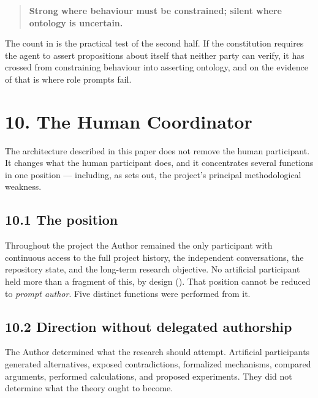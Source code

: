 \begin{quote}
\textbf{Strong where behaviour must be constrained; silent where ontology is uncertain.}
\end{quote}
The count in  is the practical test of the second half. If the constitution requires the agent to assert propositions about itself that neither party can verify, it has crossed from constraining behaviour into asserting ontology, and on the evidence of  that is where role prompts fail.


\section*{10. The Human Coordinator}
\label{sec:en:10}

The architecture described in this paper does not remove the human participant. It changes what the human participant does, and it concentrates several functions in one position — including, as  sets out, the project's principal methodological weakness.


\subsection*{10.1 The position}
\label{sec:en:10.1}

Throughout the project the Author remained the only participant with continuous access to the full project history, the independent conversations, the repository state, and the long-term research objective. No artificial participant held more than a fragment of this, by design (). That position cannot be reduced to \emph{prompt author}. Five distinct functions were performed from it.


\subsection*{10.2 Direction without delegated authorship}
\label{sec:en:10.2}

The Author determined what the research should attempt. Artificial participants generated alternatives, exposed contradictions, formalized mechanisms, compared arguments, performed calculations, and proposed experiments. They did not determine what the theory ought to become.


